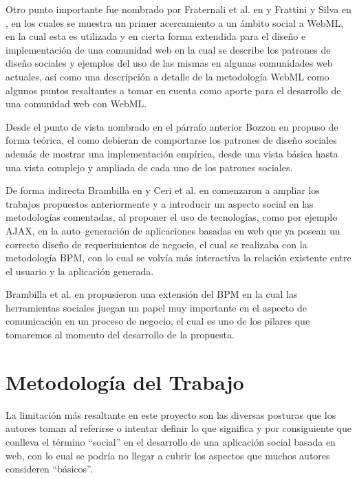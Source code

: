 \documentclass[oneside,12pt,a4paper]{memoir}%
\begin{document}
	Otro punto importante fue nombrado por Fraternali et al. en
	\cite{Fraternali2010} y Frattini y Silva en \cite{Frattini2007}, en los
	cuales se muestra un primer acercamiento a un \'ambito social a \ac{WebML}, en la cual
	esta es utilizada y en cierta forma extendida para el dise\~no e
	implementaci\'on de una comunidad web en la cual se describe los patrones de
	dise\~no sociales y ejemplos del uso de las mismas en algunas comunidades web
	actuales, as\'i como una descripci\'on a detalle de la metodolog\'ia \ac{WebML}
	como algunos puntos resaltantes a tomar en cuenta como aporte para el
	desarrollo de una comunidad web con \ac{WebML}.
	
	Desde el punto de vista nombrado en el p\'arrafo anterior
	Bozzon en \cite{Bozzon2009} propuso de forma te\'orica, el como debieran de
	comportarse los patrones de dise\~no sociales adem\'as de mostrar una
	implementaci\'on emp\'irica, desde una vista b\'asica hasta una vista complejo
	y ampliada de cada uno de los patrones sociales.
	
	De forma indirecta Brambilla en \cite{Brambilla2006} y Ceri et
	al. en \cite{Ceri2010} comenzaron a ampliar los trabajos propuestos
	anteriormente y a introducir un aspecto social en las metodolog\'ias
	comentadas, al proponer el uso de tecnolog\'ias, como por ejemplo \ac{AJAX}, en
	la auto--generaci\'on de aplicaciones basadas en web que ya posean un correcto
	dise\~no de requerimientos de negocio, el cual se realizaba con la
	metodolog\'ia \ac{BPM}, con lo cual se volv\'ia m\'as interactiva la relaci\'on
	existente entre el usuario y la aplicaci\'on generada.
	
	Brambilla et al. en \cite{Fraternali2011} propusieron una extensi\'on del
	\ac{BPM} en la cual las herramientas sociales juegan un papel muy importante en el
	aspecto de comunicaci\'on en un proceso de negocio, el cual es uno de los pilares
	que tomaremos al momento del desarrollo de la propuesta.
	
	\section{Metodolog\'ia del Trabajo}
	\label{sec:Methodology}
	La limitaci\'on m\'as resaltante en este proyecto son las diversas posturas que los
	autores toman al referirse o intentar definir lo que significa y por
	consiguiente que conlleva el t\'ermino ``social'' en el desarrollo de una
	aplicaci\'on social basada en web, con lo cual se podr\'ia no llegar a cubrir los
	aspectos que muchos autores consideren ``b\'asicos''.
	
\end{document}
